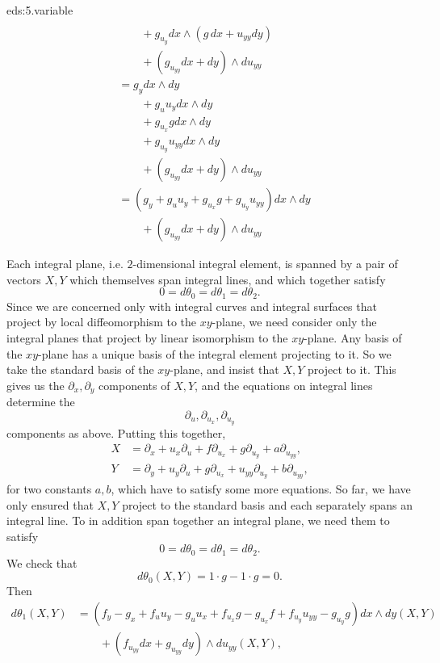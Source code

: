 \begin{answer}{eds:5.variable}
\begin{align*}
\\
&\qquad
+g_{u_y} dx\wedge (g\,dx+u_{yy}dy)
\\
&\qquad
+(g_{u_{yy}} dx+dy)\wedge du_{yy}
\\
&=
g_y dx\wedge dy
\\
&\qquad
+g_u u_y dx\wedge dy
\\
&\qquad
+g_{u_x}g dx\wedge dy
\\
&\qquad
+g_{u_y} u_{yy} dx\wedge dy
\\
&\qquad
+(g_{u_{yy}} dx+dy)\wedge du_{yy}
\\
&=
(g_y+g_u u_y + g_{u_x} g + g_{u_y} u_{yy}) dx\wedge dy
\\
&\qquad
+(g_{u_{yy}} dx+dy)\wedge du_{yy}
\end{align*}

Each integral plane, i.e. \(2\)-dimensional integral element, is spanned by a pair of vectors \(X,Y\) which themselves span integral lines, and which together satisfy 
\[
0=d\theta_0=d\theta_1=d\theta_2.
\]
Since we are concerned only with integral curves and integral surfaces that project by local diffeomorphism to the \(xy\)-plane, we need consider only the integral planes that project by linear isomorphism to the \(xy\)-plane.
Any basis of the \(xy\)-plane has a unique basis of the integral element projecting to it.
So we take the standard basis of the \(xy\)-plane, and insist that \(X,Y\) project to it.
This gives us the \(\partial_x,\partial_y\) components of \(X,Y\), and the equations on integral lines determine the
\[
\partial_u,\partial_{u_x},\partial_{u_y}
\]
components as above.
Putting this together,
\begin{align*}
X&=\partial_x+u_x\partial_u+f\partial_{u_x}+g\partial_{u_y}+a\partial_{u_{yy}},\\
Y&=\partial_y+u_y\partial_u+g\partial_{u_x}+u_{yy}\partial_{u_y}+b\partial_{u_{yy}},
\end{align*}
for two constants \(a,b\), which have to satisfy some more equations.
So far, we have only ensured that \(X,Y\) project to the standard basis and each separately spans an integral line.
To in addition span together an integral plane, we need them to satisfy
\[
0=d\theta_0=d\theta_1=d\theta_2.
\]
We check that
\[
d\theta_0(X,Y)=1\cdot g-1\cdot g=0.
\]
Then
\begin{align*}
d\theta_1(X,Y)
&=
(f_y-g_x+f_u u_y-g_u u_x
+f_{u_x}g-g_{u_x}f
+f_{u_y}u_{yy}-g_{u_y}g
)dx\wedge dy(X,Y)
\\
&\qquad+
(f_{u_{yy}} dx+g_{u_{yy}}dy)\wedge du_{yy}(X,Y),
\\

\end{align*}
\end{answer}
